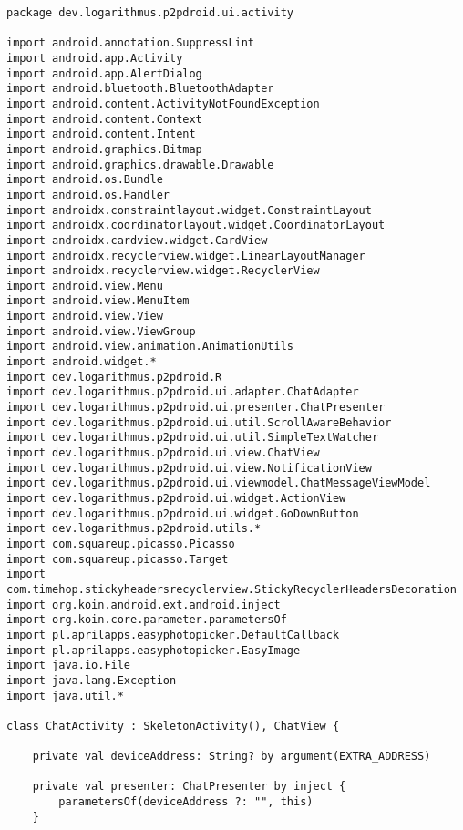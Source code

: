 
\label{sec:source_code}


\begin{lstlisting}
package dev.logarithmus.p2pdroid.ui.activity

import android.annotation.SuppressLint
import android.app.Activity
import android.app.AlertDialog
import android.bluetooth.BluetoothAdapter
import android.content.ActivityNotFoundException
import android.content.Context
import android.content.Intent
import android.graphics.Bitmap
import android.graphics.drawable.Drawable
import android.os.Bundle
import android.os.Handler
import androidx.constraintlayout.widget.ConstraintLayout
import androidx.coordinatorlayout.widget.CoordinatorLayout
import androidx.cardview.widget.CardView
import androidx.recyclerview.widget.LinearLayoutManager
import androidx.recyclerview.widget.RecyclerView
import android.view.Menu
import android.view.MenuItem
import android.view.View
import android.view.ViewGroup
import android.view.animation.AnimationUtils
import android.widget.*
import dev.logarithmus.p2pdroid.R
import dev.logarithmus.p2pdroid.ui.adapter.ChatAdapter
import dev.logarithmus.p2pdroid.ui.presenter.ChatPresenter
import dev.logarithmus.p2pdroid.ui.util.ScrollAwareBehavior
import dev.logarithmus.p2pdroid.ui.util.SimpleTextWatcher
import dev.logarithmus.p2pdroid.ui.view.ChatView
import dev.logarithmus.p2pdroid.ui.view.NotificationView
import dev.logarithmus.p2pdroid.ui.viewmodel.ChatMessageViewModel
import dev.logarithmus.p2pdroid.ui.widget.ActionView
import dev.logarithmus.p2pdroid.ui.widget.GoDownButton
import dev.logarithmus.p2pdroid.utils.*
import com.squareup.picasso.Picasso
import com.squareup.picasso.Target
import com.timehop.stickyheadersrecyclerview.StickyRecyclerHeadersDecoration
import org.koin.android.ext.android.inject
import org.koin.core.parameter.parametersOf
import pl.aprilapps.easyphotopicker.DefaultCallback
import pl.aprilapps.easyphotopicker.EasyImage
import java.io.File
import java.lang.Exception
import java.util.*

class ChatActivity : SkeletonActivity(), ChatView {

    private val deviceAddress: String? by argument(EXTRA_ADDRESS)

    private val presenter: ChatPresenter by inject {
        parametersOf(deviceAddress ?: "", this)
    }


\end{lstlisting}

